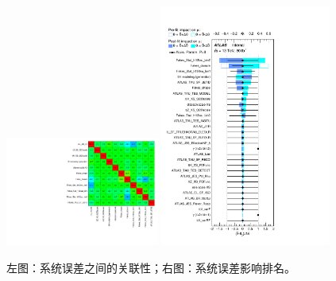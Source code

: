 \begin{figure}[htbp]
\centering
\begin{center}
  \includegraphics[width=0.45\textwidth, keepaspectratio]{fig/OneLepTwoTaus/CorrMatrix.pdf}
  \includegraphics[width=0.5\textwidth, keepaspectratio]{fig/OneLepTwoTaus/Ranking.pdf}
\end{center}
\caption{左图：系统误差之间的关联性；右图：系统误差影响排名。}
\label{Fig:1l2tau.impacts}
\end{figure}
